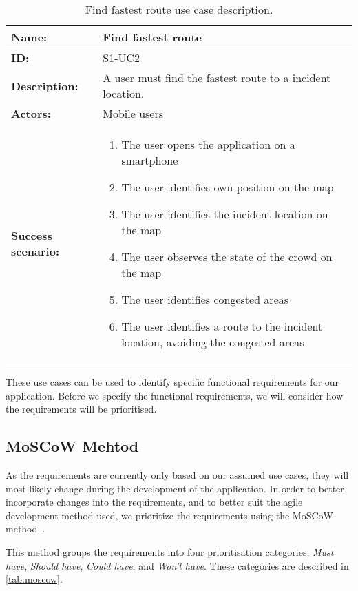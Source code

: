 \begin{table}[h!]
    \centering
    \begin{tabularx}{\textwidth}{|l|X|}
        \hline
        \textbf{Name:}  & Find fastest route \\ \hline
        \textbf{ID:}    & S1-UC2\\ \hline
        \textbf{Description:} & A user must find the fastest route to a incident location. \\ \hline
        \textbf{Actors:} & Mobile users \\ \hline
        \textbf{Success scenario:} & 
        \begin{enumerate}
            \item The user opens the application on a smartphone
            \item The user identifies own position on the map
            \item The user identifies the incident location on the map
            \item The user observes the state of the crowd on the map
            \item The user identifies congested areas
            \item The user identifies a route to the incident location, avoiding the congested areas
        \end{enumerate}
        \\
        \hline
    \end{tabularx}
    \caption{Find fastest route use case description.}
    \label{tab:s1-uc2}
\end{table}

These use cases can be used to identify specific functional requirements for our application. Before we specify the functional requirements, we will consider how the requirements will be prioritised.

\subsection{MoSCoW Mehtod}
As the requirements are currently only based on our assumed use cases, they will most likely change during the development of the application. In order to better incorporate changes into the requirements, and to better suit the agile development method used, we prioritize the requirements using the MoSCoW method~\cite{moscow}.

This method groups the requirements into four prioritisation categories; \emph{Must have}, \emph{Should have}, \emph{Could have}, and \emph{Won't have}. These categories are described in \cref{tab:moscow}.

